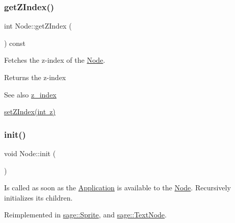 \subsubsection{\texorpdfstring{getZIndex()}{getZIndex()}}
{\footnotesize\ttfamily int Node\+::get\+Z\+Index (\begin{DoxyParamCaption}{ }\end{DoxyParamCaption}) const}



Fetches the z-\/index of the \mbox{\hyperlink{classsage_1_1Node}{Node}}. 

\begin{DoxyReturn}{Returns}
the z-\/index 
\end{DoxyReturn}
\begin{DoxySeeAlso}{See also}
\mbox{\hyperlink{classsage_1_1Node_ad98383ce93e985bf20e1cd678c622097}{z\+\_\+index}} 

\mbox{\hyperlink{classsage_1_1Node_a16a5cb054eb05a3d22e97b6d690ebc3f}{set\+Z\+Index(int z)}} 
\end{DoxySeeAlso}
\mbox{\label{classsage_1_1Node_ab87776adae83149e235e37ed469f4e10}} 
\subsubsection{\texorpdfstring{init()}{init()}}
{\footnotesize\ttfamily void Node\+::init (\begin{DoxyParamCaption}{ }\end{DoxyParamCaption})\hspace{0.3cm}{\ttfamily [virtual]}}



Is called as soon as the \mbox{\hyperlink{classsage_1_1Application}{Application}} is available to the \mbox{\hyperlink{classsage_1_1Node}{Node}}. Recursively initializes its children. 



Reimplemented in \mbox{\hyperlink{classsage_1_1Sprite_aeaf5c7aa5aeff1b0a4da9e66430f1c42}{sage\+::\+Sprite}}, and \mbox{\hyperlink{classsage_1_1TextNode_ae389b7b4afae4d068ac29686343f279e}{sage\+::\+Text\+Node}}.

\mbox{\label{classsage_1_1Node_a602f53d66ee202b54ae71b9a53057173}} 
